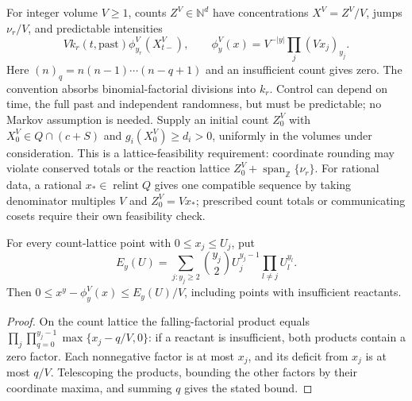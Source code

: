 For integer volume $V\ge1$, counts $Z^V\in\mathbb N^d$ have
concentrations $X^V=Z^V/V$, jumps $\nu_r/V$, and predictable intensities
\begin{equation}
 V k_r(t,\text{past})\phi^V_{y_r}(X^V_{t-}),\qquad
 \phi^V_y(x)=V^{-|y|}\prod_j(Vx_j)_{y_j}.
 \label{eq:jump-intensity}
\end{equation}
Here $(n)_q=n(n-1)\cdots(n-q+1)$ and an insufficient count gives zero.
The convention absorbs binomial-factorial divisions into $k_r$.
Control can depend on time, the full past and independent randomness,
but must be predictable; no Markov assumption is needed. Supply an
initial count $Z^V_0$ with $X^V_0\in Q\cap(c+S)$ and
$g_i(X^V_0)\ge d_i>0$, uniformly in the volumes under consideration.
This is a lattice-feasibility requirement: coordinate rounding may
violate conserved totals or the reaction lattice
$Z^V_0+\operatorname{span}_{\mathbb Z}\{\nu_r\}$.
For rational data, a rational $x_*\in\operatorname{relint}Q$ gives one
compatible sequence by taking denominator multiples $V$ and
$Z^V_0=Vx_*$; prescribed count totals or communicating cosets require
their own feasibility check.

\begin{lemma}
For every count-lattice point with $0\le x_j\le U_j$, put
\[
 E_y(U)=\sum_{j:y_j\ge2}\binom{y_j}{2}
              U_j^{y_j-1}\prod_{l\ne j}U_l^{y_l}.
\]
Then $0\le x^y-\phi^V_y(x)\le E_y(U)/V$, including points with
insufficient reactants.
\end{lemma}
\begin{proof}
On the count lattice the falling-factorial product equals
$\prod_{j}\prod_{q=0}^{y_j-1}\max\{x_j-q/V,0\}$: if a reactant is
insufficient, both products contain a zero factor. Each nonnegative
factor is at most $x_j$, and its deficit from $x_j$ is at most $q/V$.
Telescoping the products, bounding the other factors by their coordinate
maxima, and summing $q$ gives the stated bound.
\end{proof}

